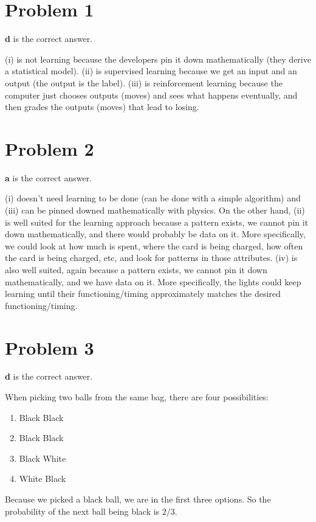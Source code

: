 \documentclass{article}
\begin{document}
\section*{Problem 1}
\textbf{d} is the correct answer.

\noindent (i) is not learning because the developers pin it down
mathematically (they derive a statistical model). (ii) is supervised learning
because we get an input and an output (the output is the label). (iii)
is reinforcement learning because the computer just chooses outputs (moves)
and sees what happens eventually, and then grades the outputs (moves) that
lead to losing.
\section*{Problem 2}
\textbf{a} is the correct answer.

\noindent (i) doesn't need learning to be done (can be done with a simple
algorithm) and (iii) can be pinned downed mathematically with physics.
On the other hand, (ii) is well suited for the learning approach because
a pattern exists, we cannot pin it down mathematically, and there would probably
be data on it. More specifically, we could look at how much is spent, where
the card is being charged, how often the card is being charged, etc, and look
for patterns in those attributes. (iv) is also well suited, again because
a pattern exists, we cannot pin it down mathematically, and we have data on it.
More specifically, the lights could keep learning until their functioning/timing
approximately matches the desired functioning/timing.
\section*{Problem 3}
\textbf{d} is the correct answer.

\noindent When picking two balls from the same bag, there are four possibilities:
\begin{enumerate}
    \item Black Black
    \item Black Black
    \item Black White
    \item White Black
\end{enumerate}
Because we picked a black ball, we are in the first three options. So the
probability of the next ball being black is $2/3$.
\end{document}
